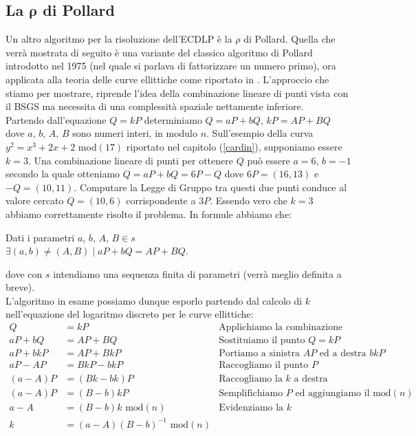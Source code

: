 \documentclass[a4paper,12pt]{tesiinfo}
\begin{document}
\subsection{La \texorpdfstring{$\mathbold{\rho}$}{p} di Pollard}
Un altro algoritmo per la risoluzione dell'ECDLP \`e la $\rho$ di Pollard. Quella che verr\`a mostrata di seguito \`e una variante del classico algoritmo di Pollard introdotto nel 1975 (nel quale si parlava di fattorizzare un numero primo), ora applicata alla teoria delle curve ellittiche come riportato in \cite{parall rho}. L'approccio che stiamo per mostrare, riprende l'idea della combinazione lineare di punti vista con il BSGS ma necessita di una complessit\`a spaziale nettamente inferiore. 
\\
Partendo dall'equazione $Q=kP$ determiniamo $Q=aP + bQ$, $kP=AP + BQ$ dove $a$, $b$, $A$, $B$ sono numeri interi, in modulo $n$. Sull'esempio della curva $y^2=x^3+2x+2$ mod$(17)$ riportato nel capitolo (\ref{cardin}), supponiamo essere $k=3$. Una combinazione lineare di punti per ottenere $Q$ pu\`o essere $a=6$, $b=-1$ secondo la quale otteniamo $Q=aP+bQ=6P-Q$ dove $6P=(16, 13)$ e $-Q=(10, 11)$. Computare la Legge di Gruppo tra questi due punti conduce al valore cercato $Q=(10, 6)$ corrispondente a $3P$. Essendo vero che $k=3$ abbiamo correttamente risolto il problema. In formule abbiamo che:
\begin{center}
Dati i parametri $a$, $b$, $A$, $B \in s$\\
 $\exists(a, b) \ne (A, B) \mid aP+bQ = AP+BQ$.
\end{center}
dove con $s$ intendiamo una sequenza finita di parametri (verr\`a meglio definita a breve).
\\
L'algoritmo in esame possiamo dunque esporlo partendo dal calcolo di $k$ nell'equazione del logaritmo discreto per le curve ellittiche:
\begin{align*}
 Q &=kP &\text{Applichiamo la combinazione lineare}\\
 aP + bQ &= AP + BQ &\text{Sostituiamo il punto }Q = kP\\
 aP + bkP &= AP + BkP &\text{Portiamo a sinistra $AP$ ed a destra $bkP$}\\
 aP -AP &= BkP -bkP &\text{Raccogliamo il punto }P\\
 (a -A)P &= (Bk -bk)P &\text{Raccogliamo la $k$ a destra}\\
 (a -A)P &= (B -b)kP &\text{Semplifichiamo $P$ ed aggiungiamo il mod$(n)$}\\
 a -A &= (B -b)k\text{ mod$(n)$} &\text{Evidenziamo la $k$}\\
 k &= (a -A)(B -b)^{-1}\text{ mod$(n)$}
\end{align*}
\end{document}
